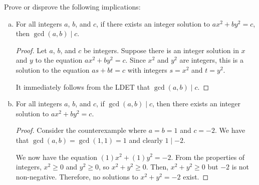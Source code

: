 \begin{recommended}
  Prove or disprove the following implications:
\end{recommended}
\begin{enumerate}[(a)]
  \item For all integers $a$, $b$, and $c$, if there exists an integer solution to $ax^2+by^2=c$,
        then $\gcd(a,b) \mid c$.
        \begin{proof}
          Let $a$, $b$, and $c$ be integers.
          Suppose there is an integer solution in $x$ and $y$ to the equation $ax^2+by^2=c$.
          Since $x^2$ and $y^2$ are integers, this is a solution to the equation $as+bt=c$
          with integers $s=x^2$ and $t=y^2$.

          It immediately follows from the LDET that $\gcd(a,b) \mid c$.
        \end{proof}
  \item For all integers $a$, $b$, and $c$, if $\gcd(a,b) \mid c$,
        then there exists an integer solution to $ax^2+by^2=c$.
        \begin{proof}
          Consider the counterexample where $a=b=1$ and $c=-2$.
          We have that $\gcd(a,b)=\gcd(1,1)=1$ and clearly $1 \mid -2$.

          We now have the equation $(1)x^2+(1)y^2=-2$.
          From the properties of integers, $x^2 \geq 0$ and $y^2 \geq 0$, so $x^2+y^2 \geq 0$.
          Then, $x^2 + y^2 \geq 0$ but $-2$ is not non-negative.
          Therefore, no solutions to $x^2+y^2=-2$ exist.
        \end{proof}
\end{enumerate}


